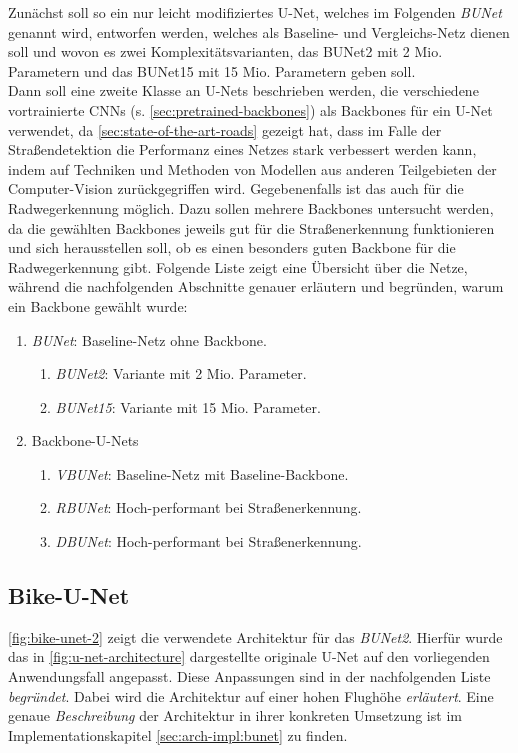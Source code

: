 Zunächst soll so ein nur leicht modifiziertes U-Net, welches im Folgenden \textit{\acf{BUNet}} 
genannt wird, entworfen werden, welches als Baseline- und Vergleichs-Netz dienen soll und 
wovon es zwei Komplexitätsvarianten, das \ac{BUNet2} mit 2 Mio. Parametern und das \ac{BUNet15} 
mit 15 Mio. Parametern geben soll. \\
Dann soll eine zweite Klasse an U-Nets beschrieben werden, die verschiedene vortrainierte \acp{CNN} (s. \autoref{sec:pretrained-backbones}) 
als Backbones für ein U-Net verwendet, da \autoref{sec:state-of-the-art-roads} gezeigt hat, 
dass im Falle der Straßendetektion die Performanz eines Netzes stark verbessert werden kann, 
indem auf Techniken und Methoden von Modellen aus anderen Teilgebieten der Computer-Vision 
zurückgegriffen wird. 
Gegebenenfalls ist das auch für die Radwegerkennung möglich. Dazu sollen mehrere Backbones untersucht werden, 
da die gewählten Backbones jeweils gut für die Straßenerkennung funktionieren und sich 
herausstellen soll, ob es einen besonders guten Backbone für die Radwegerkennung gibt. 
Folgende Liste zeigt eine Übersicht über die Netze, während die nachfolgenden Abschnitte genauer
erläutern und begründen, warum ein Backbone gewählt wurde: 
\begin{enumerate}
	\item \textit{\acf{BUNet}}: Baseline-Netz ohne Backbone.
	\begin{enumerate}
		\item \textit{\acf{BUNet2}}: Variante mit 2 Mio. Parameter.
		\item \textit{\acf{BUNet15}}: Variante mit 15 Mio. Parameter.
	\end{enumerate}
	\item Backbone-U-Nets
	\begin{enumerate}
		\item \textit{\acf{VBUNet}}: Baseline-Netz mit Baseline-Backbone.
		\item \textit{\acf{RBUNet}}: Hoch-performant bei Straßenerkennung.
		\item \textit{\acf{DBUNet}}: Hoch-performant bei Straßenerkennung.
	\end{enumerate}
\end{enumerate} 

\subsection{Bike-U-Net} \label{sec:architecture:bike-u-net}

\autoref{fig:bike-unet-2} zeigt die verwendete Architektur für das \textit{\ac{BUNet2}}. 
Hierfür wurde das in \autoref{fig:u-net-architecture} 
dargestellte originale U-Net auf den vorliegenden Anwendungsfall angepasst.
Diese Anpassungen sind in der nachfolgenden Liste \textit{begründet}. Dabei wird die Architektur auf einer 
hohen Flughöhe \textit{erläutert}. 
Eine genaue \textit{Beschreibung} der Architektur in ihrer konkreten Umsetzung 
ist im Implementationskapitel \autoref{sec:arch-impl:bunet} zu finden.  

